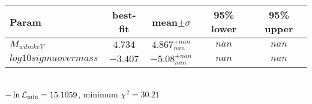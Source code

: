 \begin{tabular}{|l|c|c|c|c|} 
 \hline 
Param & best-fit & mean$\pm\sigma$ & 95\% lower & 95\% upper \\ \hline 
$M_{wdm keV }$ &$4.734$ & $4.867_{nan}^{+nan}$ & $nan$ & $nan$ \\ 
$log10sigmaovermass$ &$-3.407$ & $-5.08_{nan}^{+nan}$ & $nan$ & $nan$ \\ 
\hline 
 \end{tabular} \\ 
$-\ln{\cal L}_\mathrm{min} =15.1059$, minimum $\chi^2=30.21$ \\ 

